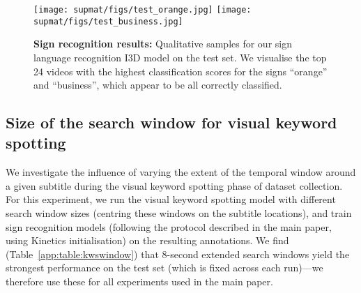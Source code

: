 \begin{figure}
    \centering
\texttt{[image: supmat/figs/test\_orange.jpg]}
    \texttt{[image: supmat/figs/test\_business.jpg]}
    \caption{\textbf{Sign recognition results:} Qualitative
    samples for our sign language recognition I3D model on the \datasetName{}
    test set. We visualise the top 24 videos
    with the highest classification scores for the signs
    ``orange'' and ``business'', which appear to be all correctly
    classified. }
    \label{app:fig:qualrecognition}
\end{figure}

\subsection{Size of the search window for visual keyword spotting} \label{app:subsec:kwswindow}

We investigate the influence of varying the extent of the temporal window around a given subtitle during the visual keyword spotting phase of dataset collection.  For this experiment, we run the visual keyword spotting model with different search window sizes (centring these windows on the subtitle locations), and train sign recognition models (following the protocol described in the main paper, using Kinetics initialisation) on the resulting annotations.   We find (Table~\ref{app:table:kwswindow}) that 8-second extended search windows yield the strongest performance on the test set (which is fixed across each run)---we therefore use these for all experiments used in the main paper.

